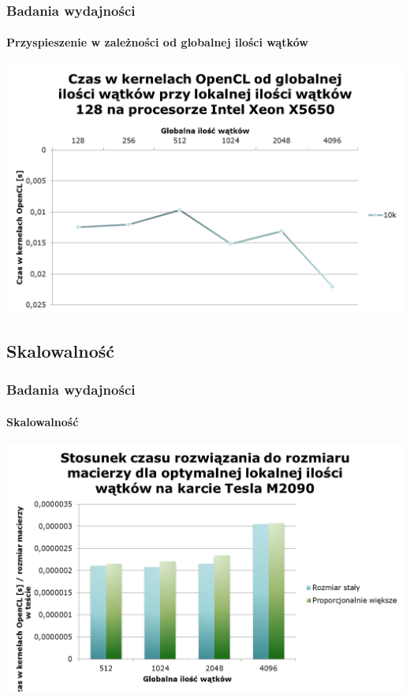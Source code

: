 \documentclass{beamer}
\begin{document}
\begin{frame}
\frametitle{Badania wydajności}
\framesubtitle{Przyspieszenie w zależności od globalnej ilości wątków}
\hfill\includegraphics[scale=0.45]{czas4.png}\hspace*{\fill}
\end{frame}

\subsection{Skalowalność}

\begin{frame}
\frametitle{Badania wydajności}
\framesubtitle{Skalowalność}
\hfill\includegraphics[scale=0.45]{czas5.png}\hspace*{\fill}
\end{frame}
\end{document}
